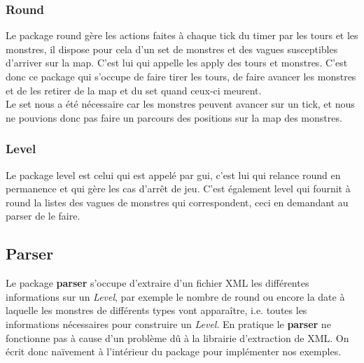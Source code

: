 \documentclass{article}
\begin{document}
\subsubsection{Round}
Le package round gère les actions faites à chaque tick du timer par les tours et les monstres, il dispose pour cela d'un set de monstres et des vagues susceptibles d'arriver sur la map. C'est lui qui appelle les apply des tours et monstres. C'est donc ce package qui s'occupe de faire tirer les tours, de faire avancer les monstres et de les retirer de la map et du set quand ceux-ci meurent.\\
Le set nous a été nécessaire car les monstres peuvent avancer sur un tick, et nous ne pouvions donc pas faire un parcours des positions sur la map des monstres.
\subsubsection{Level}
Le package level est celui qui est appelé par gui, c'est lui qui relance round en permanence et qui gère les cas d'arrêt de jeu. C'est également level qui fournit à round la listes des vagues de monstres qui correspondent, ceci en demandant au parser de le faire.
\subsection{Parser}
Le package \textbf{parser} s'occupe d'extraire d'un fichier XML les différentes informations sur un \textit{Level}, par exemple le nombre de round ou encore la date à laquelle les monstres de différents types vont apparaître, i.e. toutes les informations nécessaires pour construire un \textit{Level}. En pratique le \textbf{parser} ne fonctionne pas à cause d'un problème dû à la librairie d'extraction de XML. On écrit donc naïvement à l'intérieur du package pour implémenter nos exemples. 
\end{document}

